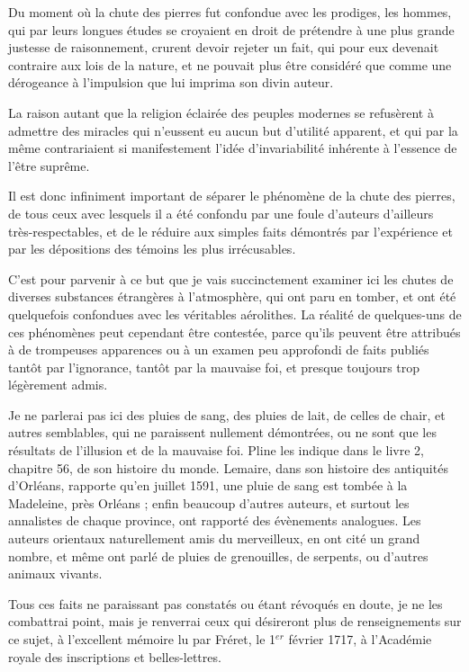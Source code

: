 \documentclass[a4paper, 12pt, oneside, french]{article}
\begin{document}
Du moment où la chute des pierres fut confondue avec les prodiges, les hommes, qui par leurs longues études se croyaient en droit de prétendre à une plus grande justesse de raisonnement, crurent devoir rejeter un fait, qui pour eux devenait contraire aux lois de la nature, et ne pouvait plus être considéré que comme une dérogeance à l'impulsion que lui imprima son divin auteur.

La raison autant que la religion éclairée des peuples modernes se refusèrent à admettre des miracles qui n'eussent eu aucun but d'utilité apparent, et qui par la même contrariaient si manifestement l'idée d'invariabilité inhérente à l'essence de l'être suprême.

Il est donc infiniment important de séparer le phénomène de la chute des pierres, de tous ceux avec lesquels il a été confondu par une foule d'auteurs d'ailleurs très-respectables, et de le réduire aux simples faits démontrés par l'expérience et par les dépositions des témoins les plus irrécusables.

C'est pour parvenir à ce but que je vais succinctement examiner ici les chutes de diverses substances étrangères à l'atmosphère, qui ont paru en tomber, et ont été quelquefois confondues avec les véritables aérolithes. La réalité de quelques-uns de ces phénomènes peut cependant être contestée, parce qu'ils peuvent être attribués à de trompeuses apparences ou à un examen peu approfondi de faits publiés tantôt par l'ignorance, tantôt par la mauvaise foi, et presque toujours trop légèrement admis.

Je ne parlerai pas ici des pluies de sang, des pluies de lait, de celles de chair, et autres semblables, qui ne paraissent nullement démontrées, ou ne sont que les résultats de l'illusion et de la mauvaise foi. Pline les indique dans le livre 2, chapitre 56, de son histoire du monde. Lemaire, dans son histoire des antiquités d'Orléans, rapporte qu'en juillet 1591, une pluie de sang est tombée à la Madeleine, près Orléans ; enfin beaucoup d'autres auteurs, et surtout les annalistes de chaque province, ont rapporté des évènements analogues. Les auteurs orientaux naturellement amis du merveilleux, en ont cité un grand nombre, et même ont parlé de pluies de grenouilles, de serpents, ou d'autres animaux vivants.

Tous ces faits ne paraissant pas constatés ou étant révoqués en doute, je ne les combattrai point, mais je renverrai ceux qui désireront plus de renseignements sur ce sujet, à l'excellent mémoire lu par Fréret, le 1$^{er}$ février 1717, à l'Académie royale des inscriptions et belles-lettres.
\end{document}
